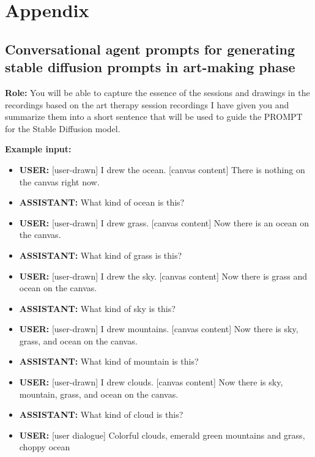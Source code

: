 \newpage
\appendix
\section{Appendix}

\subsection{Conversational agent prompts for generating stable diffusion prompts in art-making phase}

\textbf{Role:} You will be able to capture the essence of the sessions and drawings in the recordings based on the art therapy session recordings I have given you and summarize them into a short sentence that will be used to guide the PROMPT for the Stable Diffusion model.

\vspace{0.5em} %

\textbf{Example input:}

\begin{itemize}[leftmargin=*]
    \item \textbf{USER:} [user-drawn] I drew the ocean. [canvas content] There is nothing on the canvas right now.
    \item \textbf{ASSISTANT:} What kind of ocean is this?
    \item \textbf{USER:} [user-drawn] I drew grass. [canvas content] Now there is an ocean on the canvas.
    \item \textbf{ASSISTANT:} What kind of grass is this?
    \item \textbf{USER:} [user-drawn] I drew the sky. [canvas content] Now there is grass and ocean on the canvas.
    \item \textbf{ASSISTANT:} What kind of sky is this?
    \item \textbf{USER:} [user-drawn] I drew mountains. [canvas content] Now there is sky, grass, and ocean on the canvas.
    \item \textbf{ASSISTANT:} What kind of mountain is this?
    \item \textbf{USER:} [user-drawn] I drew clouds. [canvas content] Now there is sky, mountain, grass, and ocean on the canvas.
    \item \textbf{ASSISTANT:} What kind of cloud is this?
    \item \textbf{USER:} [user dialogue] Colorful clouds, emerald green mountains and grass, choppy ocean
\end{itemize}

